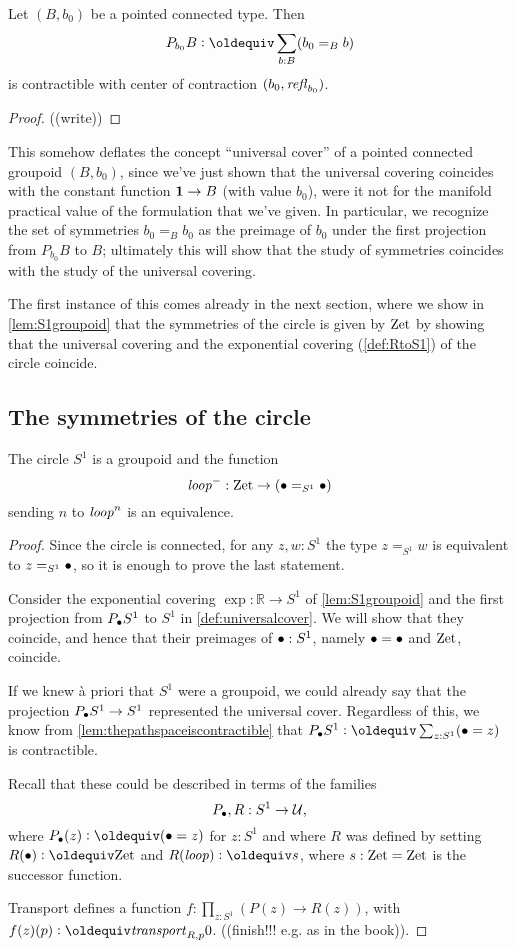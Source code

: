 \begin{lemma}
  \label{lem:thepathspaceiscontractible}
  Let $(B,b_0)$ be a pointed connected type.  Then 
$$P_{b_0}B\defequi\sum_{b:B}(b_0=_Bb)$$ is contractible with center of contraction $(b_0,\mathop{{\it refl}_{b_0}})$.
\end{lemma}
\begin{proof}
  ((write))
\end{proof}
\begin{remark}
  This somehow deflates the concept ``universal cover'' of a pointed connected groupoid $(B,b_0)$, since we've just shown that the universal covering coincides with the constant function $\mathbf{1}\to B$ (with value $b_0$), were it not for the manifold practical value of the formulation that we've given.  
In particular, we recognize the set of symmetries $b_0=_Bb_0$ as the preimage of $b_0$ under the first projection from $P_{b_0}B$ to $B$; ultimately this will show that the study of symmetries coincides with the study of the universal covering.

The first instance of this comes already in the next section, where we show in \cref{lem:S1groupoid} that the symmetries of the circle is given by $\mathrm{Zet}$ by showing that the universal covering and the exponential covering (\cref{def:RtoS1}) of the circle coincide.
\end{remark}


\subsection{The symmetries of the circle}
\label{sec:symcirc}

\begin{lemma}\label{lem:S1groupoid}
  The circle $S^1$ is a groupoid and the function
$$\mathit{loop}^-:\mathrm{Zet}\to(\bullet=_{S^1}\bullet)$$ sending $n$ to $\mathit{loop}^n$ is an equivalence.
\end{lemma}
\begin{proof}
  Since the circle is connected, for any $z,w:S^1$ the type $z=_{S^1}w$ is equivalent to $z=_{S^1}\bullet$, so it is enough to prove the last statement.  

Consider the exponential covering $\exp:\mathbb R\to S^1$ of \cref{lem:S1groupoid} and the first projection from $P_\bullet S^1$ to $S^1$ in \cref{def:universalcover}. We will show that they coincide, and hence that their preimages of $\bullet:S^1$, namely $\bullet=\bullet$ and $\mathrm{Zet}$, coincide.  

If we knew \`a priori that $S^1$ were a groupoid, we could already say that the projection $P_\bullet S^1\to S^1$ represented the universal cover.  Regardless of this, we know from \cref{lem:thepathspaceiscontractible} that $P_\base S^1\defequi\sum_{z:S^1}(\base=z)$ is contractible.

Recall that these could be described in terms of the families 
$$P_\bullet,R:S^1\to\mathcal{U},$$  
where $P_\base(z)\defequi(\base=z)$ for $z:S^1$ and where $R$ was defined by setting $R(\base)\defequi\zet$ and $R(\Sloop)\defequi s$, where $s:\mathrm{Zet}=\mathrm{Zet}$ is the successor function.

Transport defines a function $f:\prod_{z:S^1}(P(z)\to R(z))$, with $f(z)(p)\defequi\trp_{R,p}0$.
((finish!!! e.g. as in the book)).
\end{proof}
